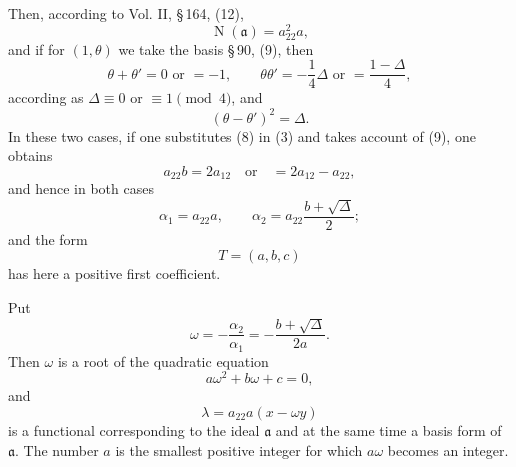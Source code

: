 \documentclass[11pt]{article}
\newcommand{\Norm}{\operatorname{N}}
\begin{document}
Then, according to Vol. II, \S\,164, (12),
\begin{equation}
 \Norm(\mathfrak a)=a_{22}^2a,
\tag{9}
\end{equation}
and if for $(1,\theta)$ we take the basis \S\,90, (9), then
\begin{equation}
\theta+\theta'=0\text{ or }=-1,
\qquad
\theta\theta'=-\frac14\Delta\text{ or }=\frac{1-\Delta}{4},
\tag{10}
\end{equation}
according as $\Delta\equiv0$ or $\equiv1\pmod4$, and
\[
 (\theta-\theta')^2=\Delta.
\]
In these two cases, if one substitutes (8) in (3) and takes account of (9), one obtains
\[
 a_{22}b=2a_{12}\quad\text{or}\quad =2a_{12}-a_{22},
\]
and hence in both cases
\begin{equation}
 \alpha_1=a_{22}a,
 \qquad
 \alpha_2=a_{22}\frac{b+\sqrt\Delta}{2};
\tag{11}
\end{equation}
and the form
\[
 T=(a,b,c)
\]
has here a positive first coefficient.

Put
\begin{equation}
 \omega=-\frac{\alpha_2}{\alpha_1}=-\frac{b+\sqrt\Delta}{2a}.
\tag{12}
\end{equation}
Then $\omega$ is a root of the quadratic equation
\begin{equation}
 a\omega^2+b\omega+c=0,
\tag{13}
\end{equation}
and
\begin{equation}
 \lambda=a_{22}a(x-\omega y)
\tag{14}
\end{equation}
is a functional corresponding to the ideal $\mathfrak a$ and at the same time a basis form of $\mathfrak a$. The number $a$ is the smallest positive integer for which $a\omega$ becomes an integer.
\end{document}
